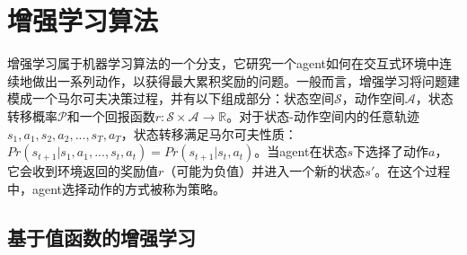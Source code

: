 

\chapter{增强学习算法}
\label{chap:RL}
增强学习属于机器学习算法的一个分支，它研究一个agent如何在交互式环境中连续地做出一系列动作，以获得最大累积奖励的问题。一般而言，增强学习将问题建模成一个马尔可夫决策过程，并有以下组成部分：状态空间$\mathcal{S}$，动作空间$\mathcal{A}$，状态转移概率$\mathcal{P}$和一个回报函数$r:\mathcal{S} \times \mathcal{A} \rightarrow \mathbb{R}$。对于状态-动作空间内的任意轨迹$s_1, a_1, s_2, a_2, ... , s_T, a_T$，状态转移满足马尔可夫性质：$Pr(s_{t+1}|s_1, a_1, ... , s_t, a_t) = Pr(s_{t+1}|s_t, a_t)$。当agent在状态$s$下选择了动作$a$，它会收到环境返回的奖励值$r$（可能为负值）并进入一个新的状态$s'$。在这个过程中，agent选择动作的方式被称为策略。
\section{基于值函数的增强学习}
